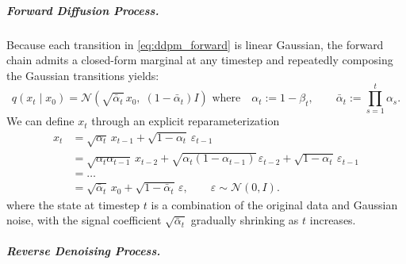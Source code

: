 \subparagraph{Forward Diffusion Process.}

Because each transition in \eqref{eq:ddpm_forward} is linear Gaussian, the forward chain admits a
closed-form marginal at any timestep and repeatedly composing the Gaussian transitions yields:
\begin{equation}
    q(x_t\mid x_0)
    =
    \mathcal{N}\!\left(
        \sqrt{\bar\alpha_t}\,x_0,\;
        (1-\bar\alpha_t)I
    \right)
    \text{ where} \quad
    \alpha_t := 1-\beta_t,
    \qquad
    \bar\alpha_t := \prod_{s=1}^{t}\alpha_s.
    \label{eq:ddpm_forward_marginal}
\end{equation}
We can define \(x_t\) through an explicit reparameterization
\begin{align}
    x_t &= \sqrt{\alpha_t}\,x_{t-1}
    +
    \sqrt{1-\alpha_t}\,\varepsilon_{t-1} \\
    &= \sqrt{\alpha_t \alpha_{t-1}}\,x_{t-2}
    +
    \sqrt{\alpha_t(1-\alpha_{t-1})}\,\varepsilon_{t-2}
    +
    \sqrt{1-\alpha_t}\,\varepsilon_{t-1} \\
    &= \dots \\
    &=
    \sqrt{\bar\alpha_t}\,x_0
    +
    \sqrt{1-\bar\alpha_t}\,\varepsilon,
    \qquad
    \varepsilon\sim\mathcal{N}(0,I).
    \label{eq:reparameterization_of_xt}
\end{align}
where the state at timestep \(t\) is a combination of the original data and Gaussian noise,
with the signal coefficient \(\sqrt{\bar\alpha_t}\) gradually shrinking as \(t\) increases.

\subparagraph{Reverse Denoising Process.}

